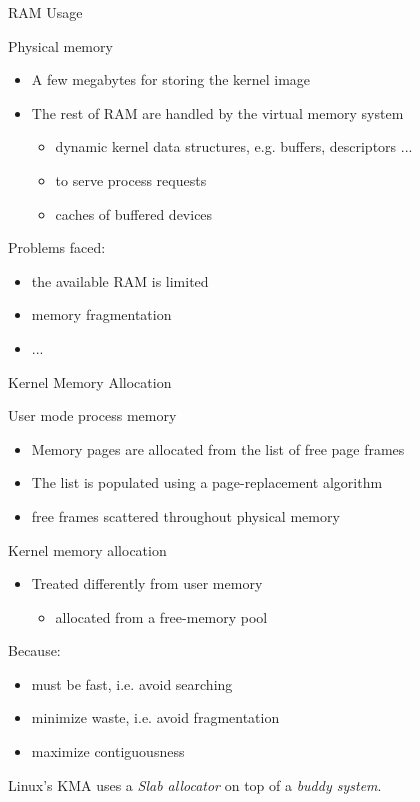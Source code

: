 \begin{frame}{RAM Usage}
  \begin{block}{Physical memory}
    \begin{itemize}
    \item A few megabytes for storing the kernel image
    \item The rest of RAM are handled by the virtual memory system
      \begin{itemize}
      \item dynamic kernel data structures, e.g. buffers, descriptors ...
      \item to serve process requests
      \item caches of buffered devices
      \end{itemize}
    \end{itemize}
  \end{block}
  \begin{block}{Problems faced:}
    \begin{itemize}
    \item the available RAM is limited
    \item memory fragmentation
    \item ...
    \end{itemize}
  \end{block}
\end{frame}

\begin{frame}{Kernel Memory Allocation}
  \begin{block}{User mode process memory}
    \begin{itemize}
    \item Memory pages are allocated from the list of free page frames
    \item The list is populated using a page-replacement algorithm
    \item free frames scattered throughout physical memory
    \end{itemize}
  \end{block}
  \begin{block}{Kernel memory allocation}
    \begin{itemize}
    \item Treated differently from user memory
      \begin{itemize}
      \item allocated from a free-memory pool
      \end{itemize}
    \end{itemize}
    Because:
    \begin{itemize}
    \item must be fast, i.e. avoid searching
    \item minimize waste, i.e. avoid fragmentation
    \item maximize contiguousness
    \end{itemize}
  \end{block}
  \begin{center}
    Linux's KMA uses a \emph{Slab allocator} on top of a \emph{buddy system}.
  \end{center}
\end{frame}


